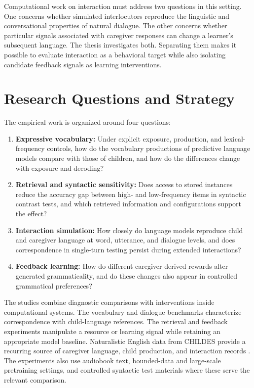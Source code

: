 Computational work on interaction must address two questions in this setting. One concerns whether simulated interlocutors reproduce the linguistic and conversational properties of natural dialogue. The other concerns whether particular signals associated with caregiver responses can change a learner's subsequent language. The thesis investigates both. Separating them makes it possible to evaluate interaction as a behavioral target while also isolating candidate feedback signals as learning interventions.

\section{Research Questions and Strategy}
\label{sec:intro:questions}

The empirical work is organized around four questions:

\begin{enumerate}
  \item \textbf{Expressive vocabulary:} Under explicit exposure, production, and lexical-frequency controls, how do the vocabulary productions of predictive language models compare with those of children, and how do the differences change with exposure and decoding?
  \item \textbf{Retrieval and syntactic sensitivity:} Does access to stored instances reduce the accuracy gap between high- and low-frequency items in syntactic contrast tests, and which retrieved information and configurations support the effect?
  \item \textbf{Interaction simulation:} How closely do language models reproduce child and caregiver language at word, utterance, and dialogue levels, and does correspondence in single-turn testing persist during extended interactions?
  \item \textbf{Feedback learning:} How do different caregiver-derived rewards alter generated grammaticality, and do these changes also appear in controlled grammatical preferences?
\end{enumerate}

The studies combine diagnostic comparisons with interventions inside computational systems. The vocabulary and dialogue benchmarks characterize correspondence with child-language references. The retrieval and feedback experiments manipulate a resource or learning signal while retaining an appropriate model baseline. Naturalistic English data from CHILDES provide a recurring source of caregiver language, child production, and interaction records \citep{macwhinney2000childes}. The experiments also use audiobook text, bounded-data and large-scale pretraining settings, and controlled syntactic test materials where these serve the relevant comparison.

